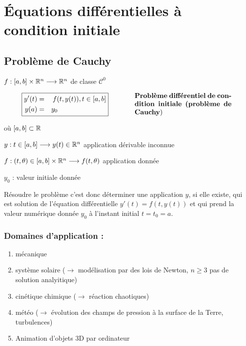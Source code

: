 \chapter{Équations différentielles à condition initiale}

\section{Problème de Cauchy}

$f : [a,b] \times \mathbb{R}^n \longrightarrow \mathbb{R}^n$ de classe $\mathcal{C}^0$

\begin{equation*}
    \begin{array}{cc}
        \boxed{\begin{aligned}
            y'(t)  & = & f(t,y(t)), t \in [a,b] \\
            y(a) & = & y_0 \hspace{2.5cm}
        \end{aligned}}
        & \hspace{1cm}
        \parbox{5cm}{\textbf{Problème différentiel de condition initiale (problème de Cauchy})}
    \end{array}
\end{equation*}

où $[a,b] \subset \mathbb{R}$

\hspace{0.5cm} $y : t \in [a,b] \longrightarrow y(t) \in \mathbb{R}^n$ application dérivable inconnue

\hspace{0.5cm} $f : (t, \theta) \in [a,b] \times \mathbb{R}^n \longrightarrow f(t,\theta)$ application donnée

\hspace{0.5cm} $y_0$ : valeur initiale donnée


Résoudre le problème c'est donc déterminer une application $y$, si elle existe, qui est solution de 
l'équation différentielle $y'(t) = f(t,y(t))$ et qui prend la valeur numérique donnée 
$y_0$ à l'instant initial $t = t_0 = a$.

\subsection*{Domaines d'application :}
\begin{enumerate}[label=-]
    \item mécanique
    \item système solaire ($\to$ modélisation par des lois de Newton, $n \geq 3$ pas de solution analyitique)
    \item cinétique chimique ($\to$ réaction chaotiques)
    \item météo ($\to$ évolution des champs de pression à la surface de la Terre, turbulences)
    \item Animation d'objets 3D par ordinateur
\end{enumerate}


